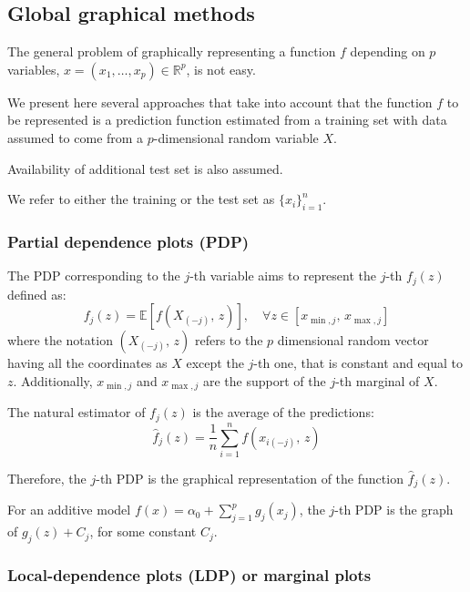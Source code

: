 \subsection{Global graphical methods}

The general problem of graphically representing a function $f$
depending on $p$ variables, $x = (x_1,\ldots,x_p) \in \mathbb R^p$,
is not easy.

We present here several approaches that take into account that the function $f$ to be represented
is a prediction function estimated from a training set with data assumed to come from a
$p$-dimensional random variable $X$.

Availability of additional test set is also assumed.

We refer to either the training or the test set as $\{x_i\}_{i=1}^n$.

\subsubsection{Partial dependence plots (PDP)}

The PDP corresponding to the $j$-th variable aims to
represent the $j$-th  $f_j(z)$ defined as:
\begin{equation*}
	f_j(z) = \mathds E \left[
		f(X_{(-j)},\,z)
		\right],\quad\forall z \in \left[
	x_{\min,j},\,x_{\max,j}
	\right]
\end{equation*}
where the notation $(X_{(-j)},\,z)$ refers to the $p$ dimensional random
vector having all the coordinates as $X$ except the $j$-th one, that is
constant and equal to $z$. Additionally, $x_{\min,j}$ and $x_{\max,j}$ are the
support of the $j$-th marginal of $X$.

The natural estimator of $f_j(z)$ is the average of the predictions:
\begin{equation*}
	\hat f_j(z) = \frac{1}{n} \sum_{i=1}^n f(x_{i(-j)},\,z)
\end{equation*}

Therefore, the $j$-th PDP is the graphical representation of the function $\hat f_j(z)$.

For an additive model $f(x) = \alpha_0 + \sum_{j=1}^p g_j(x_j)$, the $j$-th PDP
is the graph of $g_j(z) + C_j$, for some constant $C_j$.

\subsubsection{Local-dependence plots (LDP) or marginal plots}

